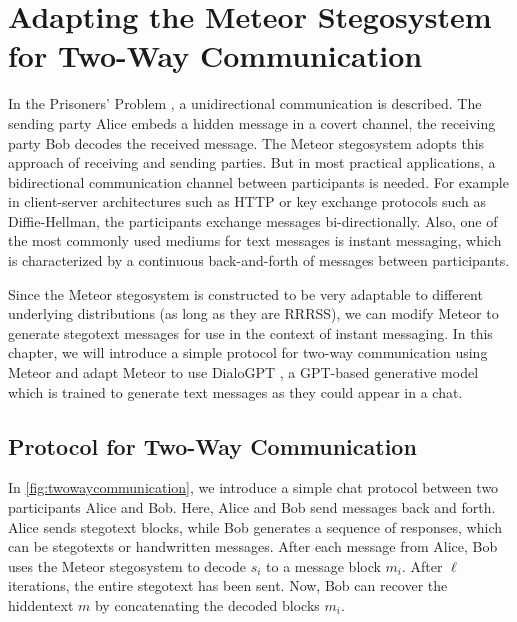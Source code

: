 \chapter{Adapting the Meteor Stegosystem for Two-Way Communication}
\label{chap:twowaycommunication}


In the Prisoners' Problem \cite{Simmons1983}, a unidirectional communication is described.
The sending party Alice embeds a hidden message in a covert channel, the receiving party Bob decodes the received message.
The Meteor stegosystem adopts this approach of receiving and sending parties.
But in most practical applications, a bidirectional communication channel between participants is needed.
For example in client-server architectures such as HTTP or key exchange protocols such as Diffie-Hellman, the participants exchange messages bi-directionally.
Also, one of the most commonly used mediums for text messages is instant messaging, which is characterized by a continuous back-and-forth of messages between participants.

Since the Meteor stegosystem is constructed to be very adaptable to different underlying distributions (as long as they are RRRSS), we can modify Meteor to generate stegotext messages for use in the context of instant messaging.
In this chapter, we will introduce a simple protocol for two-way communication using Meteor and adapt Meteor to use DialoGPT \cite{Zhang2020}, a GPT-based generative model which is trained to generate text messages as they could appear in a chat.

\section{Protocol for Two-Way Communication}

In \autoref{fig:twowaycommunication}, we introduce a simple chat protocol between two participants Alice and Bob.
Here, Alice and Bob send messages back and forth.
Alice sends stegotext blocks, while Bob generates a sequence of responses, which can be stegotexts or handwritten messages.
After each message from Alice, Bob uses the Meteor stegosystem to decode $s_i$ to a message block $m_i$.
After $\ell$ iterations, the entire stegotext has been sent.
Now, Bob can recover the hiddentext $m$ by concatenating the decoded blocks $m_i$.


